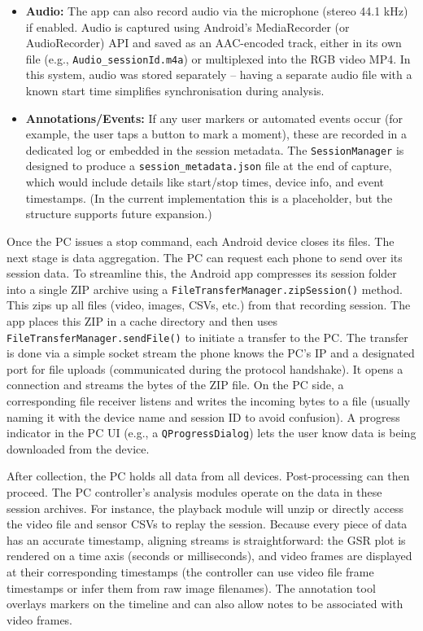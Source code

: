 \begin{itemize}
    \item \textbf{Audio:} The app can also record audio via the microphone (stereo 44.1 kHz) if enabled. Audio is captured using Android's MediaRecorder (or AudioRecorder) API and saved as an AAC-encoded track, either in its own file (e.g., \texttt{Audio\_\<sessionId\>.m4a}) or multiplexed into the RGB video MP4. In this system, audio was stored separately -- having a separate audio file with a known start time simplifies synchronisation during analysis.
    \item \textbf{Annotations/Events:} If any user markers or automated events occur (for example, the user taps a button to mark a moment), these are recorded in a dedicated log or embedded in the session metadata. The \texttt{SessionManager} is designed to produce a \texttt{session\_metadata.json} file at the end of capture, which would include details like start/stop times, device info, and event timestamps. (In the current implementation this is a placeholder, but the structure supports future expansion.)
\end{itemize}

Once the PC issues a stop command, each Android device closes its files. The next stage is data aggregation. The PC can request each phone to send over its session data. To streamline this, the Android app compresses its session folder into a single ZIP archive using a \texttt{FileTransferManager.zipSession()} method. This zips up all files (video, images, CSVs, etc.) from that recording session. The app places this ZIP in a cache directory and then uses \texttt{FileTransferManager.sendFile()} to initiate a transfer to the PC. The transfer is done via a simple socket stream \textemdash the phone knows the PC's IP and a designated port for file uploads (communicated during the protocol handshake). It opens a connection and streams the bytes of the ZIP file. On the PC side, a corresponding file receiver listens and writes the incoming bytes to a file (usually naming it with the device name and session ID to avoid confusion). A progress indicator in the PC UI (e.g., a \texttt{QProgressDialog}) lets the user know data is being downloaded from the device.

After collection, the PC holds all data from all devices. Post-processing can then proceed. The PC controller's analysis modules operate on the data in these session archives. For instance, the playback module will unzip or directly access the video file and sensor CSVs to replay the session. Because every piece of data has an accurate timestamp, aligning streams is straightforward: the GSR plot is rendered on a time axis (seconds or milliseconds), and video frames are displayed at their corresponding timestamps (the controller can use video file frame timestamps or infer them from raw image filenames). The annotation tool overlays markers on the timeline and can also allow notes to be associated with video frames.

